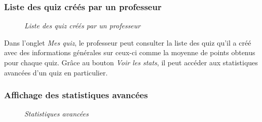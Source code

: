 \documentclass[a4paper,11pt,openany,oneside]{sphinxmanual}
\begin{document}
\subsubsection{Liste des quiz créés par un professeur}
\label{doc-user:liste-des-quiz-crees-par-un-professeur}\begin{figure}[htbp]
\centering
\capstart

\caption{\emph{Liste des quiz créés par un professeur}}\end{figure}

Dans l'onglet \emph{Mes quiz}, le professeur peut consulter la liste des quiz qu'il a créé avec des informations générales sur ceux-ci comme la moyenne de points obtenus pour chaque quiz. Grâce au bouton \emph{Voir les stats}, il peut accéder aux statistiques avancées d'un quiz en particulier.


\subsubsection{Affichage des statistiques avancées}
\label{doc-user:affichage-des-statistiques-avancees}\begin{figure}[htbp]
\centering
\capstart

\caption{\emph{Statistiques avancées}}\end{figure}
\end{document}
